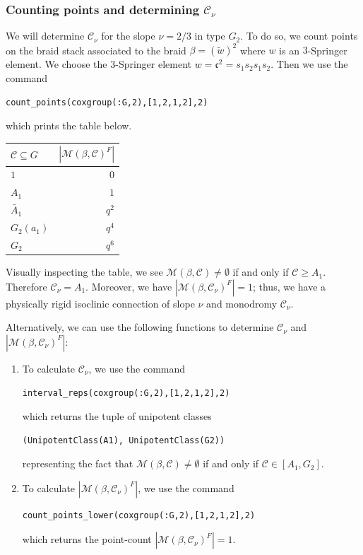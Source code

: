 \documentclass[11pt]{amsart}
\theoremstyle{definition}
\newcommand{\cC}{\mathcal{C}}
\newcommand{\cM}{\mathcal{M}}
\begin{document}
\subsubsection{Counting points and determining $\cC_\nu$}
We will determine $\cC_\nu$ for the slope $\nu=2/3$ in type $G_2$. To do so, we count points on the braid stack associated to the braid $\beta = (\widetilde{w})^2$ where $w$ is an $3$-Springer element. We choose the $3$-Springer element $w=\mathfrak{c}^2 = s_1s_2s_1s_2$. Then we use the command
\begin{center}
\begin{verbatim}
count_points(coxgroup(:G,2),[1,2,1,2],2)
\end{verbatim}
\end{center}
which prints the table below.

\begin{table}[h]
\begin{tabular}{|l|r|}
\hline
$\cC \subseteq G$ & $|\mathcal{M}(\beta,\cC)^F|$ \\
\hline
$1$ & $0$ \\
$A_1$ & $1$ \\
$\widetilde{A_1}$ & $q^2$ \\
$G_2(a_1)$ & $q^4$ \\
$G_2$ & $q^6$ \\
\hline
\end{tabular}
\end{table}
Visually inspecting the table, we see $\cM(\beta,\cC)\neq \emptyset$ if and only if $\cC\geq A_1$. Therefore $\cC_\nu = A_1$. Moreover, we have $|\cM(\beta,\cC_\nu)^F|=1$; thus, we have a physically rigid isoclinic connection of slope $\nu$ and monodromy $\cC_\nu$.

Alternatively, we can use the following functions to determine $\cC_\nu$ and $|\cM(\beta,\cC_\nu)^F|$:

\begin{enumerate}[\itshape(i)]
\item To calculate $\cC_\nu$, we use the command
\begin{center}
\begin{verbatim}
interval_reps(coxgroup(:G,2),[1,2,1,2],2)
\end{verbatim}
\end{center}
which returns the tuple of unipotent classes
\begin{center}
\begin{verbatim}
(UnipotentClass(A1), UnipotentClass(G2))
\end{verbatim}
\end{center}
representing the fact that $\cM(\beta,\cC)\neq \emptyset$ if and only if $\cC\in[A_1,G_2]$.
\item To calculate $|\cM(\beta,\cC_\nu)^F|$, we use the command
\begin{center}
\begin{verbatim}
count_points_lower(coxgroup(:G,2),[1,2,1,2],2)
\end{verbatim}
\end{center}
which returns the point-count $|\cM(\beta,\cC_\nu)^F|=1$.
\end{enumerate}
\end{document}

